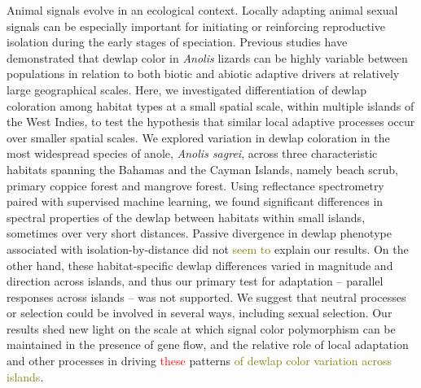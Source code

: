 Animal signals evolve in an ecological context. Locally adapting animal sexual signals can be especially important for initiating or reinforcing reproductive isolation during the early stages of speciation. Previous studies have demonstrated that dewlap color in \textit{Anolis} lizards can be highly variable between populations in relation to both biotic and abiotic adaptive drivers at relatively large geographical scales. Here, we investigated differentiation of dewlap coloration among habitat types at a small spatial scale, within multiple islands of the West Indies, to test the hypothesis that similar local adaptive processes occur over smaller spatial scales. We explored variation in dewlap coloration in the most widespread species of anole, \textit{Anolis sagrei}, across three characteristic habitats spanning the Bahamas and the Cayman Islands, namely beach scrub, primary coppice forest and mangrove forest. Using reflectance spectrometry paired with supervised machine learning, we found significant differences in spectral properties of the dewlap between habitats within small islands, sometimes over very short distances. Passive divergence in dewlap phenotype associated with isolation-by-distance did not \textcolor{olive}{seem to} explain our results. On the other hand, these habitat-specific dewlap differences varied in magnitude and direction across islands, and thus our primary test for adaptation -- parallel responses across islands -- was not supported. We suggest that neutral processes or selection could be involved in several ways, including sexual selection. Our results shed new light on the scale at which signal color polymorphism can be maintained in the presence of gene flow, and the relative role of local adaptation and other processes in driving \textcolor{red}{these} patterns \textcolor{olive}{of dewlap color variation across islands}.

